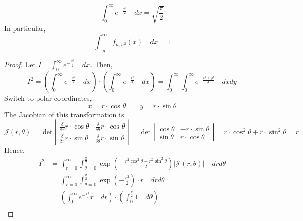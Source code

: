 \begin{theorem} \quad                                                        \\
\[
    \int_{0}^{\infty} e^{-\frac{x^2}{2}} \quad dx = \sqrt{\frac{\pi}{2}}
\]
In particular,
\[
    \int_{-\infty}^{\infty} f_{\mu, \sigma^2}(x) \quad dx = 1
\]
\end{theorem}
\begin{proof}
Let $I = \int_{0}^{\infty} e^{-\frac{x^2}{2}} \quad dx$. Then,
\[
    I^2 = (\int_{0}^{\infty} e^{-\frac{x^2}{2}} \quad dx) \cdot
          (\int_{0}^{\infty} e^{-\frac{x^2}{2}} \quad dx)
        = \int_{0}^{\infty} \int_{0}^{\infty}
              e^{-\frac{x^2 + y^2}{2}}
          \quad dxdy
\]
Switch to polar coordinates,
\[
    x = r \cdot \cos{\theta} \qquad y = r \cdot \sin{\theta}
\]
The Jacobian of this transformation is
\[
    \mathcal{J}(r, \theta) = \det \left\vert \begin{array}{cc}
          \frac{\delta}{\delta r} r \cdot \cos{\theta}
        & \frac{\delta}{\delta \theta} r \cdot \cos{\theta}                  \\
          \frac{\delta}{\delta r} r \cdot \sin{\theta}
        & \frac{\delta}{\delta \theta} r \cdot \sin{\theta}
    \end{array} \right\vert
    = \det \left\vert \begin{array}{cc}
          \cos{\theta}         & -r \cdot \sin{\theta}                       \\
          \sin{\theta}         &  r \cdot \cos{\theta}
    \end{array} \right\vert
    = r \cdot \cos^2{\theta} + r \cdot \sin^2{\theta}
    = r
\]
Hence,
\begin{align*}
    I^2 &= \int_{r = 0}^{\infty} \int_{\theta = 0}^{\frac{\pi}{2}} 
           \exp \left(
               -\frac{r^2 \cos^2{\theta} + r^2 \sin^2{\theta}}{2}
           \right)
           \vert \mathcal{J}(r, \theta) \vert \quad drd\theta                \\
        &= \int_{r = 0}^{\infty} \int_{\theta = 0}^{\frac{\pi}{2}}
               \exp \left( -\frac{r^2}{2} \right) \cdot r 
           \quad drd\theta                                                   \\
        &= \left(
               \int_{0}^{\infty} e^{-\frac{r^2}{2}} r \quad dr
           \right) \cdot
           \left(
               \int_{0}^{\frac{\pi}{2}} 1 \quad d\theta                 
           \right)                                                           \\

\end{align*}
\end{proof}
